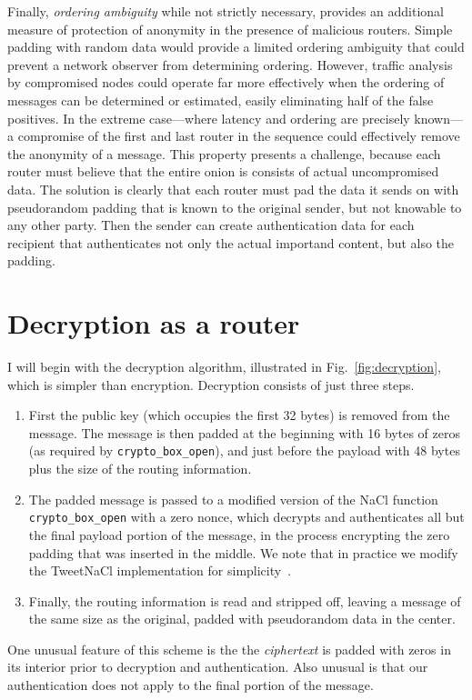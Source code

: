 \documentclass[letterpaper,twocolumn,amsmath,amssymb,pre,aps,10pt]{revtex4-1}
\begin{document}
Finally, \emph{ordering ambiguity} while not strictly necessary,
provides an additional measure of protection of anonymity in the
presence of malicious routers.  Simple padding with random data would
provide a limited ordering ambiguity that could prevent a network
observer from determining ordering.  However, traffic analysis by
compromised nodes could operate far more effectively when the ordering
of messages can be determined or estimated, easily eliminating half of
the false positives.  In the extreme case---where latency and ordering
are precisely known---a compromise of the first and last router in the
sequence could effectively remove the anonymity of a message.  This
property presents a challenge, because each router must believe that
the entire onion is consists of actual uncompromised data.  The
solution is clearly that each router must pad the data it sends on
with pseudorandom padding that is known to the original sender, but
not knowable to any other party.  Then the sender can create
authentication data for each recipient that authenticates not only the
actual importand content, but also the padding.

\section{Decryption as a router}

I will begin with the decryption algorithm, illustrated in
Fig.~\ref{fig:decryption}, which is simpler than encryption.
Decryption consists of just three steps.
\begin{enumerate}
\item First the public key (which occupies the first 32 bytes) is
  removed from the message.  The message is then padded at the
  beginning with 16 bytes of zeros (as required by
  \verb!crypto_box_open!), and just before the payload with 48 bytes
  plus the size of the routing information.
\item The padded message is passed to a modified version of the NaCl
  function \verb!crypto_box_open! with a zero nonce, which decrypts
  and authenticates all but the final payload portion of the message,
  in the process encrypting the zero padding that was inserted in the
  middle.  We note that in practice we modify the TweetNaCl
  implementation for simplicity~\cite{bernstein2014tweetnacl}.
\item Finally, the routing information is read and stripped off,
  leaving a message of the same size as the original, padded with
  pseudorandom data in the center.
\end{enumerate}
One unusual feature of this scheme is the the \emph{ciphertext} is
padded with zeros in its interior prior to decryption and
authentication.  Also unusual is that our authentication does not
apply to the final portion of the message.
\end{document}
